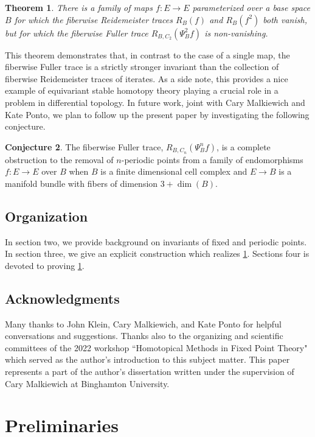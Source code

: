 \documentclass[11pt]{amsart}
\theoremstyle{plain}   %
\newtheorem{thm}{Theorem}[section] %
\theoremstyle{definition}
\newtheorem{conj}[thm]{Conjecture}
\theoremstyle{remark}
\numberwithin{equation}{section}
\begin{document}
\begin{thm}\label{thm:main}
There is a family of maps $f\colon E\to E$ parameterized over a base space $B$ for which the fiberwise Reidemeister traces $R_B(f)$ and $R_B(f^2)$ both vanish, but for which the fiberwise Fuller trace $R_{B,C_2}(\Psi_B^2 f)$ is non-vanishing.
\end{thm}

This theorem demonstrates that, in contrast to the case of a single map, the fiberwise Fuller trace is a strictly stronger invariant than the collection of fiberwise Reidemeister traces of iterates. As a side note, this provides a nice example of equivariant stable homotopy theory playing a crucial role in a problem in differential topology. In future work, joint with Cary Malkiewich and Kate Ponto, we plan to follow up the present paper by investigating the following conjecture.

\begin{conj}\cite[Conjecture 1.8]{mp2}
The fiberwise Fuller trace, $R_{B,C_n}(\Psi_B^n f)$, is a complete obstruction to the removal of $n$-periodic points from a family of endomorphisms $f\colon E\to E$ over $B$ when $B$ is a finite dimensional cell complex and $E\to B$ is a manifold bundle with fibers of dimension $3+\dim(B)$. 
\end{conj}

\subsection{Organization}

In section two, we provide background on invariants of fixed and periodic points. In section three, we give an explicit construction which realizes \cref{thm:main}. Sections four is devoted to proving \cref{thm:main}.

\subsection{Acknowledgments}

Many thanks to John Klein, Cary Malkiewich, and Kate Ponto for helpful conversations and suggestions. Thanks also to the organizing and scientific committees of the 2022 workshop ``Homotopical Methods in Fixed Point Theory" which served as the author's introduction to this subject matter. This paper represents a part of the author's dissertation written under the supervision of Cary Malkiewich at Binghamton University. 

\section{Preliminaries}
\end{document}
